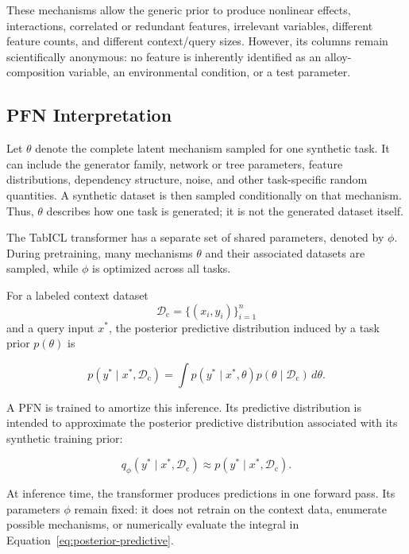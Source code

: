 \documentclass{article}
\begin{document}
These mechanisms allow the generic prior to produce nonlinear effects, interactions, correlated or redundant features, irrelevant variables, different feature counts, and different context/query sizes. However, its columns remain scientifically anonymous: no feature is inherently identified as an alloy-composition variable, an environmental condition, or a test parameter.

\subsection{PFN Interpretation}

Let \(\theta\) denote the complete latent mechanism sampled for one synthetic task. It can include the generator family, network or tree parameters, feature distributions, dependency structure, noise, and other task-specific random quantities. A synthetic dataset is then sampled conditionally on that mechanism. Thus, \(\theta\) describes how one task is generated; it is not the generated dataset itself.

The TabICL transformer has a separate set of shared parameters, denoted by \(\phi\). During pretraining, many mechanisms \(\theta\) and their associated datasets are sampled, while \(\phi\) is optimized across all tasks.

For a labeled context dataset
\[
\mathcal{D}_{\mathrm{c}}
=
\{(x_i,y_i)\}_{i=1}^{n}
\]
and a query input \(x^\ast\), the posterior predictive distribution induced by a task prior \(p(\theta)\) is

\begin{equation}
p(y^\ast\mid x^\ast,\mathcal{D}_{\mathrm{c}})
=
\int
p(y^\ast\mid x^\ast,\theta)
p(\theta\mid\mathcal{D}_{\mathrm{c}})
\,d\theta.
\label{eq:posterior-predictive}
\end{equation}

A PFN is trained to amortize this inference. Its predictive distribution is intended to approximate the posterior predictive distribution associated with its synthetic training prior:

\begin{equation}
q_{\phi}(y^\ast\mid x^\ast,\mathcal{D}_{\mathrm{c}})
\approx
p(y^\ast\mid x^\ast,\mathcal{D}_{\mathrm{c}}).
\label{eq:pfn-approximation}
\end{equation}

At inference time, the transformer produces predictions in one forward pass. Its parameters \(\phi\) remain fixed: it does not retrain on the context data, enumerate possible mechanisms, or numerically evaluate the integral in Equation~\eqref{eq:posterior-predictive}.
\end{document}
